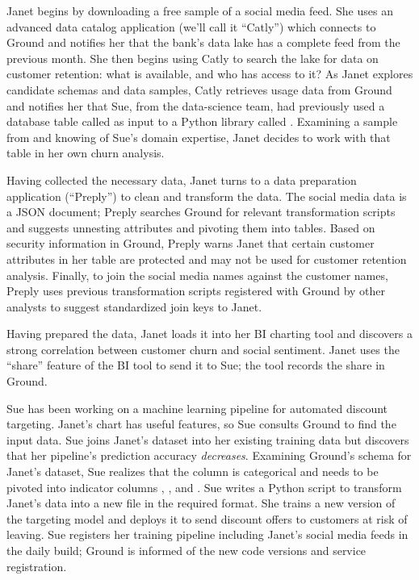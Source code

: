 \documentclass{sig-alternate}
\begin{document}
Janet 
begins by downloading a free sample of a social media feed.
She uses an advanced data catalog application (we'll call it ``Catly'') which connects to Ground 
and notifies her that the bank's data lake has a complete feed from the previous month. 
She then begins using Catly to search the lake for data on customer retention: what is available, and who has access to it?  
As Janet explores candidate schemas and data samples, Catly retrieves usage data from Ground and notifies her that Sue, from the data-science team, had previously used a database table called  as input to a Python library called .
Examining a sample from  and knowing of Sue's domain expertise, Janet decides to work with that table in her own churn analysis. 

Having collected the necessary data, Janet turns to a data preparation application (``Preply'') to clean and transform the data. 
The social media data is a JSON document; Preply searches Ground for relevant transformation scripts and suggests unnesting attributes and pivoting them into tables.
Based on security information in Ground, Preply warns Janet that certain customer attributes in her table are protected and may not be used for customer retention analysis.
Finally, to join the social media names against the customer names, Preply uses previous transformation scripts registered with Ground by other analysts to suggest standardized join keys to Janet.


Having prepared the data, Janet loads it into her BI charting tool and discovers a strong correlation between customer churn and social sentiment. 
Janet uses the ``share'' feature of the BI tool to send it to Sue; the tool records the share in Ground.


Sue has been working on a machine learning pipeline for automated discount targeting. Janet's chart has useful features, so Sue consults Ground to find the input data.
Sue joins Janet's dataset into her existing training data but discovers that her pipeline's prediction accuracy \emph{decreases}.  
Examining Ground's schema for Janet's dataset, Sue realizes that the  column is categorical and needs to be pivoted into indicator columns , , and . 
Sue writes a Python script to transform Janet's data into a new file in the required format.
She trains a new version of the targeting model and deploys it to send discount offers to customers at risk of leaving.
Sue registers her training pipeline including Janet's social media feeds in the daily build; Ground is informed of the new code versions and service registration.
\end{document}
